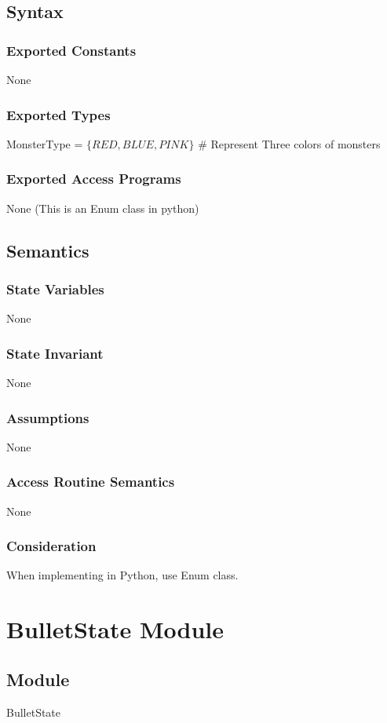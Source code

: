 \documentclass[12pt]{article}
\begin{document}
\subsection*{Syntax}
\subsubsection*{Exported Constants}
None
\subsubsection*{Exported Types}
MonsterType = $\{RED, BLUE, PINK\}$ \# Represent Three colors of monsters
\subsubsection*{Exported Access Programs}
None (This is an Enum class in python)

\subsection*{Semantics}
\subsubsection*{State Variables}
None
\subsubsection*{State Invariant}
None
\subsubsection*{Assumptions}
None
\subsubsection*{Access Routine Semantics}
None
\subsubsection*{Consideration}
When implementing in Python, use Enum class.
\newpage

\section{BulletState Module}

\subsection*{Module}
BulletState
\end{document}
